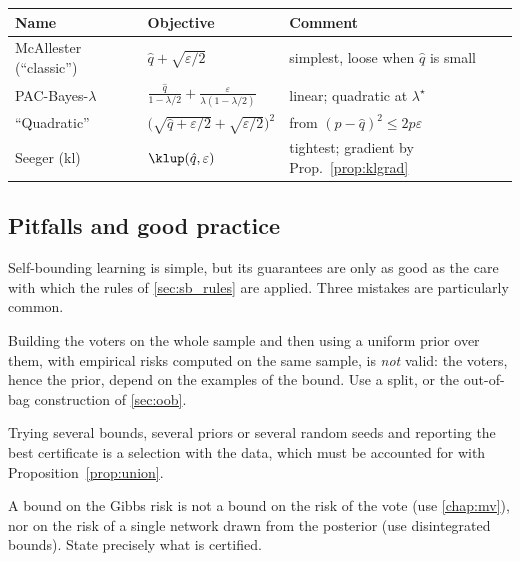 \begin{center}
\renewcommand{\arraystretch}{1.5}
\begin{tabular}{lll}
\toprule
Name & Objective & Comment \\
\midrule
McAllester (``classic'') & $\hat q+\sqrt{\varepsilon/2}$ & simplest, loose when $\hat q$ is small \\
PAC-Bayes-$\lambda$ & $\frac{\hat q}{1-\lambda/2}+\frac{\varepsilon}{\lambda(1-\lambda/2)}$ & linear; quadratic at $\lambda^\star$ \\
``Quadratic'' & $\big(\sqrt{\hat q+\varepsilon/2}+\sqrt{\varepsilon/2}\big)^2$ & from $(p-\hat q)^2\leq2p\varepsilon$ \\
Seeger (kl) & $\klup(\hat q,\varepsilon)$ & tightest; gradient by Prop.~\ref{prop:klgrad} \\
\bottomrule
\end{tabular}
\end{center}

\subsection{Pitfalls and good practice}

Self-bounding learning is simple, but its guarantees are only as good as the
care with which the rules of \cref{sec:sb_rules} are applied. Three mistakes are
particularly common.

\begin{pitfall}
Building the voters on the whole sample and then using a uniform prior over them,
with empirical risks computed on the same sample, is \emph{not} valid: the
voters, hence the prior, depend on the examples of the bound. Use a split, or the
out-of-bag construction of \cref{sec:oob}.
\end{pitfall}

\begin{pitfall}
Trying several bounds, several priors or several random seeds and reporting the
best certificate is a selection with the data, which must be accounted for with
Proposition~\ref{prop:union}.
\end{pitfall}

\begin{pitfall}
A bound on the Gibbs risk is not a bound on the risk of the vote (use
\cref{chap:mv}), nor on the risk of a single network drawn from the posterior
(use disintegrated bounds). State precisely what is certified.
\end{pitfall}

